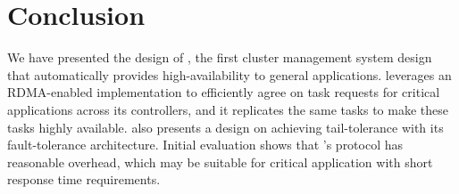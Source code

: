 \section{Conclusion} \label{sec:conclusion}

We have presented the design of \xxx, the first cluster management system 
design that automatically provides high-availability to general applications. 
\xxx leverages an RDMA-enabled \paxos implementation to efficiently agree on 
task requests for critical applications across its controllers, and it 
replicates the same tasks to make these tasks highly available. \xxx also 
presents a design on achieving tail-tolerance with its fault-tolerance 
architecture. Initial evaluation shows that \xxx's protocol has reasonable 
overhead, which may be suitable for critical application with short response 
time requirements. 

